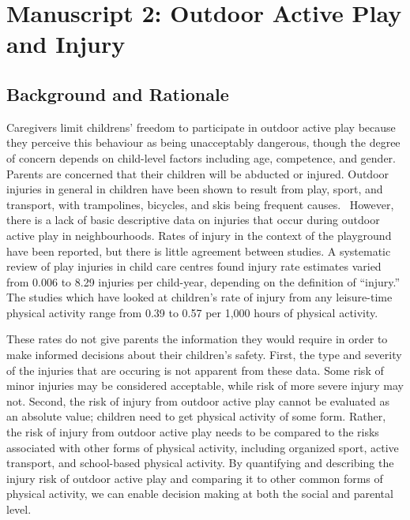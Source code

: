 \documentclass [11pt]{article}
\begin{document}
\section{Manuscript 2: Outdoor Active Play and Injury}
\subsection{Background and Rationale}

Caregivers limit childrens' freedom to participate in outdoor active play because they perceive this behaviour as being unacceptably dangerous, though the degree of concern depends on child-level factors including age, competence, and gender.~\cite{Mitra2014-qg, Lee2015-nz} Parents are concerned that their children will be abducted or injured. Outdoor injuries in general in children have been shown to result from play, sport, and transport, with trampolines, bicycles, and skis being frequent causes.~\cite{Gyllencreutz2015-ng,Klimek2013-er,Eager2013-dt} However, there is a lack of basic descriptive data on injuries that occur during outdoor active play in neighbourhoods. Rates of injury in the context of the playground have been reported, but there is little agreement between studies. A systematic review of play injuries in child care centres found injury rate estimates varied from 0.006 to 8.29 injuries per child-year, depending on the definition of ``injury.'' \cite{Hashikawa2015-nc} The studies which have looked at children's rate of injury from any leisure-time physical activity range from 0.39 to 0.57 per 1,000 hours of physical activity.~\cite{nauta2015injury} 

These rates do not give parents the information they would require in order to make informed decisions about their children's safety. First, the type and severity of the injuries that are occuring is not apparent from these data. Some risk of minor injuries may be considered acceptable, while risk of more severe injury may not. Second, the risk of injury from outdoor active play cannot be evaluated as an absolute value; children need to get physical activity of some form. Rather, the risk of injury from outdoor active play needs to be compared to the risks associated with other forms of physical activity, including organized sport, active transport, and school-based physical activity. By quantifying and describing the injury risk of outdoor active play and comparing it to other common forms of physical activity, we can enable decision making at both the social and parental level. 
\end{document}
